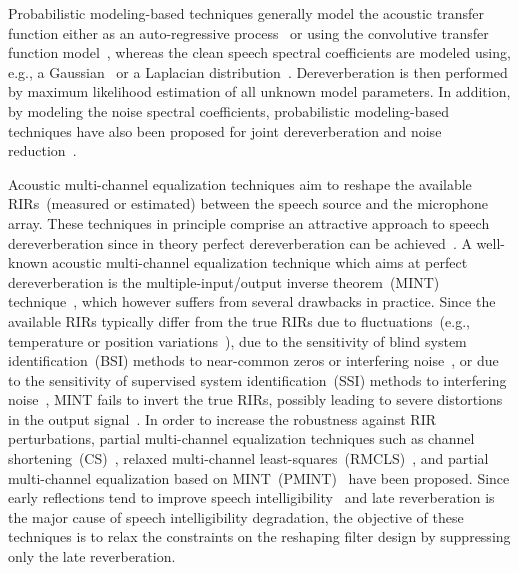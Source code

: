 \documentclass[10pt]{IEEEtran}
\begin{document}
Probabilistic modeling-based techniques generally model the acoustic transfer function either as an auto-regressive process~\cite{Nakatani_ITASLP_2010,Jukic_ICASSP_2014} or using the convolutive transfer function model~\cite{Schwartz_ITASLP_2015}, whereas the clean speech spectral coefficients are modeled using, e.g., a Gaussian~\cite{Nakatani_ITASLP_2010} or a Laplacian distribution~\cite{Jukic_ICASSP_2014}.
Dereverberation is then performed by maximum likelihood estimation of all unknown model parameters. 
In addition, by modeling the noise spectral coefficients, probabilistic modeling-based techniques have also been proposed for joint dereverberation and noise reduction~\cite{Yoshioka_ITASLP_2009,Ito_ICASSP_2014}.

Acoustic multi-channel equalization techniques aim to reshape the available RIRs~(measured or estimated) between the speech source and the microphone array. 
These techniques in principle comprise an attractive approach to speech dereverberation since in theory perfect dereverberation can be achieved~\cite{Miyoshi_ITASS_1988,Hacihabibouglu_ITASLP_2012}.
A well-known acoustic multi-channel equalization technique which aims at perfect dereverberation is the multiple-input/output inverse theorem~(MINT) technique~\cite{Miyoshi_ITASS_1988}, which however suffers from several drawbacks in practice. 
Since the available RIRs typically differ from the true RIRs due to fluctuations~(e.g., temperature or position variations~\cite{Radlovic_ITSA_2000}), due to the sensitivity of blind system identification~(BSI) methods to near-common zeros or interfering noise~\cite{Haque_SPL_2008,Lin_ITASLP_2012,Lim_IWAENC_2014}, or due to the sensitivity of supervised system identification~(SSI) methods to interfering noise~\cite{Lim_ITASLP_2014}, MINT fails to invert the true RIRs, possibly leading to severe distortions in the output signal~\cite{Kodrasi_ITASLP_2013,Lim_ITASLP_2014}.
In order to increase the robustness against RIR perturbations, partial multi-channel equalization techniques such as channel shortening~(CS)~\cite{Kallinger_ICASSP_2006}, relaxed multi-channel least-squares~(RMCLS)~\cite{Lim_ITASLP_2014}, and partial multi-channel equalization based on MINT~(PMINT)~\cite{Kodrasi_ITASLP_2013} have been proposed. 
Since early reflections tend to improve speech intelligibility~\cite{Arweiler_JASA_2011} and late reverberation is the major cause of speech intelligibility degradation, the objective of these techniques is to relax the constraints on the reshaping filter design by suppressing only the late reverberation.
\end{document}
